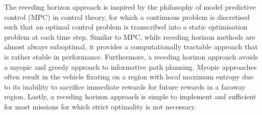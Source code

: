 \documentclass{article}
\begin{document}
		The receding horizon approach is inspired by the philosophy of model predictive control (MPC) in control theory, for which a continuous problem is discretised such that an optimal control problem is transcribed into a static optimisation problem at each time step. Similar to MPC, while receding horizon methods are almost always suboptimal, it provides a computationally tractable approach that is rather stable in performance. Furthermore, a receding horizon approach avoids a myopic and greedy approach to informative path planning. Myopic approaches often result in the vehicle fixating on a region with local maximum entropy due to its inability to sacrifice immediate rewards for future rewards in a faraway region. Lastly, a receding horizon approach is simple to implement and sufficient for most missions for which strict optimality is not necessary.
		
\end{document}
